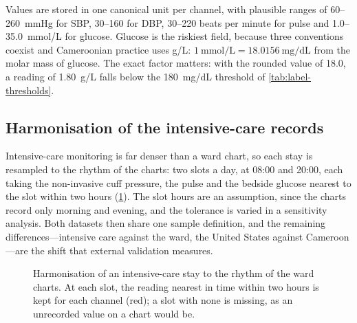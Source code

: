 Values are stored in one canonical unit per channel, with plausible ranges of 60--260~mmHg for SBP, 30--160 for DBP, 30--220 beats per minute for pulse and 1.0--35.0~mmol/L for glucose. Glucose is the riskiest field, because three conventions coexist and Cameroonian practice uses g/L: $1~\text{mmol/L} = 18.0156~\text{mg/dL}$ from the molar mass of glucose. The exact factor matters: with the rounded value of 18.0, a reading of 1.80~g/L falls below the 180~mg/dL threshold of \cref{tab:label-thresholds}.

\subsection{Harmonisation of the intensive-care records}\label{sec:harmonisation}

Intensive-care monitoring is far denser than a ward chart, so each stay is resampled to the rhythm of the charts: two slots a day, at 08:00 and 20:00, each taking the non-invasive cuff pressure, the pulse and the bedside glucose nearest to the slot within two hours (\cref{fig:harmonisation}). The slot hours are an assumption, since the charts record only morning and evening, and the tolerance is varied in a sensitivity analysis. Both datasets then share one sample definition, and the remaining differences---intensive care against the ward, the United States against Cameroon---are the shift that external validation measures.

\begin{figure}[htbp]
\centering
{}
\caption{Harmonisation of an intensive-care stay to the rhythm of the ward charts. At each slot, the reading nearest in time within two hours is kept for each channel (red); a slot with none is missing, as an unrecorded value on a chart would be.}\label{fig:harmonisation}
\end{figure}

